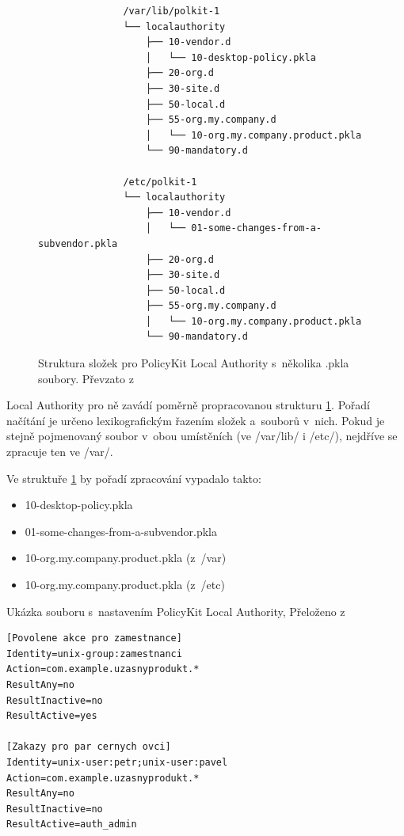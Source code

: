 \begin{figure}[h]
    \centering
    \begin{verbatim}
               /var/lib/polkit-1
               └── localauthority
                   ├── 10-vendor.d
                   │   └── 10-desktop-policy.pkla
                   ├── 20-org.d
                   ├── 30-site.d
                   ├── 50-local.d
                   ├── 55-org.my.company.d
                   │   └── 10-org.my.company.product.pkla
                   └── 90-mandatory.d

               /etc/polkit-1
               └── localauthority
                   ├── 10-vendor.d
                   │   └── 01-some-changes-from-a-subvendor.pkla
                   ├── 20-org.d
                   ├── 30-site.d
                   ├── 50-local.d
                   ├── 55-org.my.company.d
                   │   └── 10-org.my.company.product.pkla
                   └── 90-mandatory.d\end{verbatim}
\label{fig:pkit_strukture}
\caption{Struktura složek pro PolicyKit Local Authority s~několika .pkla soubory. Převzato z~\cite{manpklocalauth}}
\end{figure}

Local Authority pro ně zavádí poměrně propracovanou strukturu \ref{fig:pkit_strukture}. Pořadí načítání je určeno lexikografickým řazením složek a~souborů v~nich. Pokud je stejně pojmenovaný soubor v~obou umístěních (ve /var/lib/ i /etc/), nejdříve se zpracuje ten ve /var/.

Ve struktuře \ref{fig:pkit_strukture} by pořadí zpracování vypadalo takto:
\begin{itemize}
\item 10-desktop-policy.pkla
\item 01-some-changes-from-a-subvendor.pkla
\item 10-org.my.company.product.pkla (z~/var)
\item 10-org.my.company.product.pkla (z~/etc)
\end{itemize}

\begin{mylisting}
\caption{Ukázka souboru s~nastavením PolicyKit Local Authority, Přeloženo z~\cite{manpklocalauth}}
\label{fig:pkit_pkla}
\begin{lstlisting}
[Povolene akce pro zamestnance]
Identity=unix-group:zamestnanci
Action=com.example.uzasnyprodukt.*
ResultAny=no
ResultInactive=no
ResultActive=yes

[Zakazy pro par cernych ovci]
Identity=unix-user:petr;unix-user:pavel
Action=com.example.uzasnyprodukt.*
ResultAny=no
ResultInactive=no
ResultActive=auth_admin
\end{lstlisting}
\end{mylisting}

